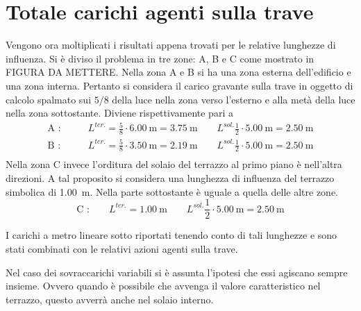 \section{Totale carichi agenti sulla trave}
Vengono ora moltiplicati i risultati appena trovati per le relative lunghezze di influenza. 
Si è diviso il problema in tre zone: A, B e C come mostrato in FIGURA DA METTERE. 
Nella zona A e B si ha una zona esterna dell'edificio e una zona interna.
Pertanto si considera il carico gravante sulla trave in oggetto di calcolo spalmato sui $5/8$ della luce nella zona verso l'esterno e alla metà della luce nella zona sottostante.  
Diviene rispettivamente pari a 
\begin{align*}
	\text{A :}&\qquad L^{ter.}=\frac{5}{8}\cdot\SI{6.00}{\meter}=\SI{3.75}{\meter} \qquad 
				L^{sol.} \frac{1}{2}\cdot\SI{5.00}{\meter} = \SI{2.50}{\meter}\\
	\text{B :}&\qquad L^{ter.}=\frac{5}{8}\cdot\SI{3.50}{\meter}=\SI{2.19}{\meter} \qquad 
				L^{sol.} \frac{1}{2}\cdot\SI{5.00}{\meter} = \SI{2.50}{\meter}\\
\end{align*}
Nella zona C invece l'orditura del solaio del terrazzo al primo piano è nell'altra direzioni. 
A tal proposito si considera una lunghezza di influenza del terrazzo simbolica di \SI{1.00}{\meter}.
Nella parte sottostante è uguale a quella delle altre zone.
\[
	\text{C :}\qquad L^{ter.}=\SI{1.00}{\meter} \qquad 
				L^{sol.} \frac{1}{2}\cdot\SI{5.00}{\meter} = \SI{2.50}{\meter}
\]

I carichi a metro lineare sotto riportati tenendo conto di tali lunghezze e sono stati combinati con le relativi azioni agenti sulla trave.

Nel caso dei sovraccarichi variabili si è assunta l'ipotesi che essi agiscano sempre insieme. 
Ovvero quando è possibile che avvenga il valore caratteristico nel terrazzo, questo avverrà anche nel solaio interno.
